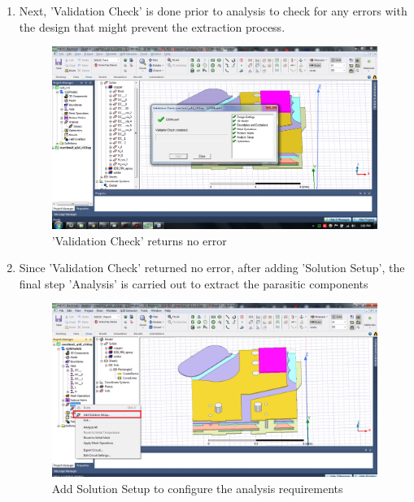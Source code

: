 \begin{enumerate}
\item Next, 'Validation Check' is done prior to analysis to check for any errors with the design that might prevent the extraction process.

\begin{figure} [H]
  \centering
  \includegraphics[width=\linewidth]{pictures/examples/valid.png}
  \caption{'Validation Check' returns no error}
  \label{fig:valid}
\end{figure}

\item Since 'Validation Check' returned no error, after adding 'Solution Setup', the final step 'Analysis' is carried out to extract the parasitic components

\begin{figure} [H]
  \centering
  \includegraphics[width=\linewidth]{pictures/examples/solution.png}
  \caption{Add Solution Setup to configure the analysis requirements}
  \label{fig:solution}
\end{figure}


\end{enumerate}
